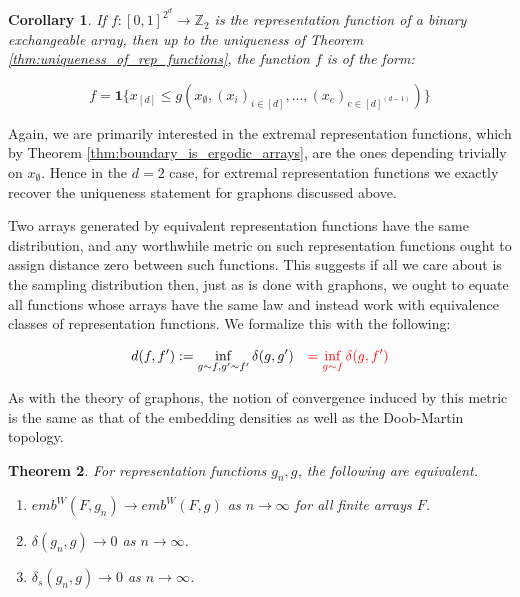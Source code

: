 \documentclass[11pt,oneside,reqno]{article}
\theoremstyle{plain}
\newtheorem{theorem}{Theorem}[section]
\newtheorem{corollary}[theorem]{Corollary}
\theoremstyle{definition}
\numberwithin{equation}{section}
\renewcommand{\leq}{\leqslant}
\newcommand{\red}{\textcolor{red}}
\newcommand{\ind}{\mathbf{1}}
\begin{document}
\begin{corollary}
    If $f:[0,1]^{2^d} \to \mathbb{Z}_2$ is the representation function of a binary exchangeable array, then up to the uniqueness of Theorem \ref{thm:uniqueness_of_rep_functions}, the function $f$ is of the form:

    \[f = \ind \Big\{x_{[d]} \leq g\left(x_\emptyset, (x_i)_{i \in [d]}, ..., (x_e)_{e \in [d]^{(d-1)}} \right)\Big\}\]

    \label{cor:classification_binary_array_processes}
\end{corollary}

Again, we are primarily interested in the extremal representation functions, which by Theorem \ref{thm:boundary_is_ergodic_arrays}, are the ones depending trivially on $x_\emptyset$. Hence in the $d=2$ case, for extremal representation functions we exactly recover the uniqueness statement for graphons discussed above.
 
 Two arrays generated by equivalent representation functions have the same distribution, and any worthwhile metric on such representation functions ought to assign distance zero between such functions. This suggests if all we care about is the sampling distribution then, just as is done with graphons, we ought to equate all functions whose arrays have the same law and instead work with equivalence classes of representation functions. We formalize this with the following:

\[d(f, f') := \inf_{g \sim f, g' \sim f'} \delta(g,g') \quad \red{= \inf_{g \sim f} \delta(g,f')}\]

\noindent As with the theory of graphons, the notion of convergence induced by this metric is the same as that of the embedding densities as well as the Doob-Martin topology.

\begin{theorem}
    For representation functions $g_n,g$, the following are equivalent.
    \begin{enumerate}[label = (\roman*)]
        \item $emb^W(F,g_n) \to emb^W(F,g)$ as $n \to \infty$ for all finite arrays $F$.

        \item $\delta(g_n,g) \to 0$ as $n \to \infty$.
        
        \item $\delta_s(g_n,g) \to 0$ as $n \to \infty$.

    \end{enumerate}
    \label{thm:conv_embed_implies_conv_cut_metric}
\end{theorem}
\end{document}
